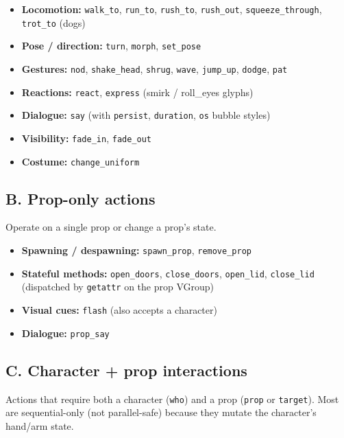 \documentclass[
  12pt,
  letterpaper,
]{book}
\providecommand{\tightlist}{%
  \setlength{\itemsep}{0pt}\setlength{\parskip}{0pt}}
\begin{document}
\begin{itemize}
\tightlist
\item
  \textbf{Locomotion:} \texttt{walk\_to}, \texttt{run\_to},
  \texttt{rush\_to}, \texttt{rush\_out}, \texttt{squeeze\_through},
  \texttt{trot\_to} (dogs)
\item
  \textbf{Pose / direction:} \texttt{turn}, \texttt{morph},
  \texttt{set\_pose}
\item
  \textbf{Gestures:} \texttt{nod}, \texttt{shake\_head}, \texttt{shrug},
  \texttt{wave}, \texttt{jump\_up}, \texttt{dodge}, \texttt{pat}
\item
  \textbf{Reactions:} \texttt{react}, \texttt{express} (smirk /
  roll\_eyes glyphs)
\item
  \textbf{Dialogue:} \texttt{say} (with \texttt{persist},
  \texttt{duration}, \texttt{os} bubble styles)
\item
  \textbf{Visibility:} \texttt{fade\_in}, \texttt{fade\_out}
\item
  \textbf{Costume:} \texttt{change\_uniform}
\end{itemize}

\subsection{B. Prop-only actions}\label{b.-prop-only-actions}

Operate on a single prop or change a prop's state.

\begin{itemize}
\tightlist
\item
  \textbf{Spawning / despawning:} \texttt{spawn\_prop},
  \texttt{remove\_prop}
\item
  \textbf{Stateful methods:} \texttt{open\_doors},
  \texttt{close\_doors}, \texttt{open\_lid}, \texttt{close\_lid}
  (dispatched by \texttt{getattr} on the prop VGroup)
\item
  \textbf{Visual cues:} \texttt{flash} (also accepts a character)
\item
  \textbf{Dialogue:} \texttt{prop\_say}
\end{itemize}

\subsection{C. Character + prop
interactions}\label{c.-character-prop-interactions}

Actions that require both a character (\texttt{who}) and a prop
(\texttt{prop} or \texttt{target}). Most are sequential-only (not
parallel-safe) because they mutate the character's hand/arm state.
\end{document}
